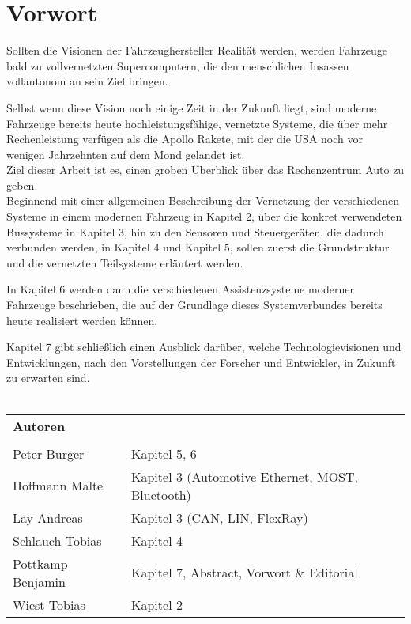 \section{Vorwort}

Sollten die Visionen der Fahrzeughersteller Realität werden, werden Fahrzeuge bald zu vollvernetzten Supercomputern, die
den menschlichen Insassen vollautonom an sein Ziel bringen.

Selbst wenn diese Vision noch einige Zeit in der Zukunft liegt, sind moderne Fahrzeuge bereits heute
hochleistungsfähige, vernetzte Systeme, die über mehr Rechenleistung verfügen als die Apollo Rakete, mit der die USA noch
vor wenigen Jahrzehnten auf dem Mond gelandet ist.
\\
Ziel dieser Arbeit ist es, einen groben Überblick über das Rechenzentrum Auto zu geben.\\

Beginnend mit einer allgemeinen Beschreibung der Vernetzung der verschiedenen Systeme in einem modernen Fahrzeug 
in Kapitel 2, über die konkret verwendeten Bussysteme in Kapitel 3, hin
zu den Sensoren und Steuergeräten, die dadurch verbunden werden, in Kapitel 4 und Kapitel 5, sollen zuerst die Grundstruktur und die vernetzten Teilsysteme
erläutert werden.

In Kapitel 6 werden dann die verschiedenen Assistenzsysteme moderner Fahrzeuge beschrieben, die auf der Grundlage dieses Systemverbundes bereits heute
realisiert werden können.

Kapitel 7 gibt schließlich einen Ausblick darüber, welche Technologievisionen und Entwicklungen, nach den Vorstellungen der Forscher und Entwickler, in Zukunft zu erwarten sind.\\\\

\begin{center}
    \begin{tabular}{l l}
        \textbf{Autoren} &\\\\
        Peter Burger & Kapitel 5, 6\\
        Hoffmann Malte & Kapitel 3 (Automotive Ethernet, MOST, Bluetooth)\\
        Lay Andreas & Kapitel 3 (CAN, LIN, FlexRay)\\
        Schlauch Tobias & Kapitel 4\\
        Pottkamp Benjamin & Kapitel 7, Abstract, Vorwort \& Editorial\\
        Wiest Tobias & Kapitel 2
    \end{tabular}
\end{center}

